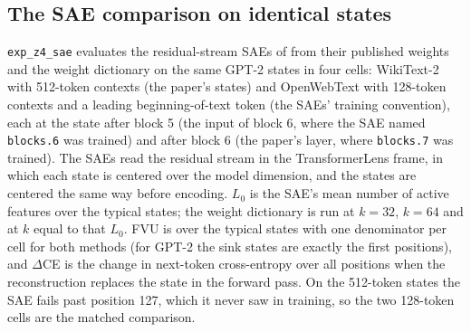 \subsection{The SAE comparison on identical states}\label{app:z4}
\texttt{exp\_z4\_sae} evaluates the residual-stream SAEs of \citet{bloom2024} from their published weights and the weight dictionary on the same GPT-2 states in four cells: WikiText-2 with 512-token contexts (the paper's states) and OpenWebText with 128-token contexts and a leading beginning-of-text token (the SAEs' training convention), each at the state after block 5 (the input of block 6, where the SAE named \texttt{blocks.6} was trained) and after block 6 (the paper's layer, where \texttt{blocks.7} was trained). The SAEs read the residual stream in the TransformerLens frame, in which each state is centered over the model dimension, and the states are centered the same way before encoding. $L_0$ is the SAE's mean number of active features over the typical states; the weight dictionary is run at $k=32$, $k=64$ and at $k$ equal to that $L_0$. FVU is over the typical states with one denominator per cell for both methods (for GPT-2 the sink states are exactly the first positions), and $\Delta$CE is the change in next-token cross-entropy over all positions when the reconstruction replaces the state in the forward pass. On the 512-token states the SAE fails past position 127, which it never saw in training, so the two 128-token cells are the matched comparison.
